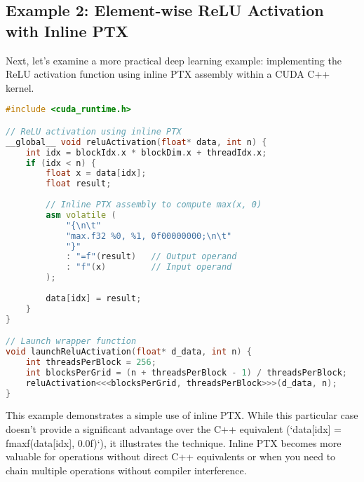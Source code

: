 \subsection{Example 2: Element-wise ReLU Activation with Inline PTX}

Next, let's examine a more practical deep learning example: implementing the ReLU activation function using inline PTX assembly within a CUDA C++ kernel.

\begin{lstlisting}[language=C++]
#include <cuda_runtime.h>

// ReLU activation using inline PTX
__global__ void reluActivation(float* data, int n) {
    int idx = blockIdx.x * blockDim.x + threadIdx.x;
    if (idx < n) {
        float x = data[idx];
        float result;
        
        // Inline PTX assembly to compute max(x, 0)
        asm volatile (
            "{\n\t"
            "max.f32 %0, %1, 0f00000000;\n\t"
            "}"
            : "=f"(result)   // Output operand
            : "f"(x)         // Input operand
        );
        
        data[idx] = result;
    }
}

// Launch wrapper function
void launchReluActivation(float* d_data, int n) {
    int threadsPerBlock = 256;
    int blocksPerGrid = (n + threadsPerBlock - 1) / threadsPerBlock;
    reluActivation<<<blocksPerGrid, threadsPerBlock>>>(d_data, n);
}
\end{lstlisting}

This example demonstrates a simple use of inline PTX. While this particular case doesn't provide a significant advantage over the C++ equivalent (`data[idx] = fmaxf(data[idx], 0.0f)`), it illustrates the technique. Inline PTX becomes more valuable for operations without direct C++ equivalents or when you need to chain multiple operations without compiler interference.


